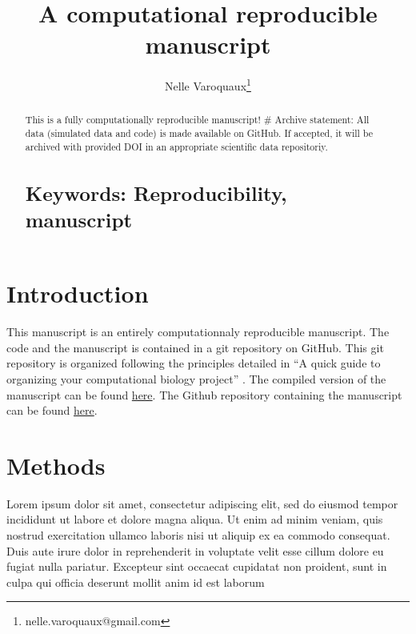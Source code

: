 \documentclass[9pt,a4paper,]{extarticle}
\begin{document}
\pagestyle{front}

\title{A computational reproducible manuscript}

\author[1]{Nelle Varoquaux\thanks{\ttfamily nelle.varoquaux@gmail.com}}

\maketitle
\thispagestyle{front}

\begin{abstract}
This is a fully computationally reproducible manuscript!
\# Archive statement:
All data (simulated data and code) is made available on GitHub. If accepted,
it will be archived with provided DOI in an appropriate scientific data
repositoriy.

\hypertarget{keywords-reproducibility-manuscript}{%
\section{Keywords: Reproducibility, manuscript}\label{keywords-reproducibility-manuscript}}
\end{abstract}


\clearpage
\pagestyle{main}

\hypertarget{introduction}{%
\section{Introduction}\label{introduction}}

This manuscript is an entirely computationnaly reproducible manuscript. The
code and the manuscript is contained in a git repository on GitHub. This git
repository is organized following the principles detailed in ``A quick guide
to organizing your computational biology project'' \citep{noble:quick}. The compiled
version of the manuscript can be found
\href{https://nellev.github.io/computationally-reproducible-manuscript/manuscript.pdf}{here}.
The Github repository containing the manuscript can be found
\href{http://github.com/NelleV/computationally-reproducible-manuscript}{here}.

\hypertarget{methods}{%
\section{Methods}\label{methods}}

Lorem ipsum dolor sit amet, consectetur adipiscing elit, sed do eiusmod tempor
incididunt ut labore et dolore magna aliqua. Ut enim ad minim veniam, quis
nostrud exercitation ullamco laboris nisi ut aliquip ex ea commodo consequat.
Duis aute irure dolor in reprehenderit in voluptate velit esse cillum dolore
eu fugiat nulla pariatur. Excepteur sint occaecat cupidatat non proident, sunt
in culpa qui officia deserunt mollit anim id est laborum
\end{document}
